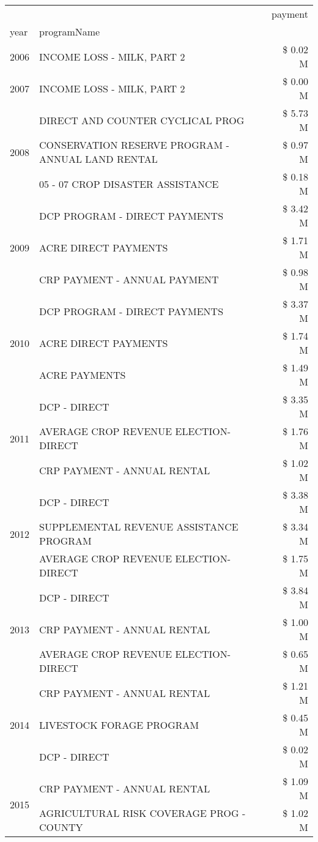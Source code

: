 \begin{tabular}{llr}
\toprule
 &  & payment \\
year & programName &  \\
\midrule
2006 & INCOME LOSS - MILK, PART 2 & \$ 0.02 M \\
\cline{1-3}
2007 & INCOME LOSS - MILK, PART 2 & \$ 0.00 M \\
\cline{1-3}
\multirow[t]{3}{*}{2008} & DIRECT AND COUNTER CYCLICAL PROG & \$ 5.73 M \\
 & CONSERVATION RESERVE PROGRAM - ANNUAL LAND RENTAL & \$ 0.97 M \\
 & 05 - 07 CROP DISASTER ASSISTANCE & \$ 0.18 M \\
\cline{1-3}
\multirow[t]{3}{*}{2009} & DCP PROGRAM - DIRECT PAYMENTS & \$ 3.42 M \\
 & ACRE DIRECT PAYMENTS & \$ 1.71 M \\
 & CRP PAYMENT - ANNUAL PAYMENT & \$ 0.98 M \\
\cline{1-3}
\multirow[t]{3}{*}{2010} & DCP PROGRAM - DIRECT PAYMENTS & \$ 3.37 M \\
 & ACRE DIRECT PAYMENTS & \$ 1.74 M \\
 & ACRE PAYMENTS & \$ 1.49 M \\
\cline{1-3}
\multirow[t]{3}{*}{2011} & DCP - DIRECT & \$ 3.35 M \\
 & AVERAGE CROP REVENUE ELECTION-DIRECT & \$ 1.76 M \\
 & CRP PAYMENT - ANNUAL RENTAL & \$ 1.02 M \\
\cline{1-3}
\multirow[t]{3}{*}{2012} & DCP - DIRECT & \$ 3.38 M \\
 & SUPPLEMENTAL REVENUE ASSISTANCE PROGRAM & \$ 3.34 M \\
 & AVERAGE CROP REVENUE ELECTION-DIRECT & \$ 1.75 M \\
\cline{1-3}
\multirow[t]{3}{*}{2013} & DCP - DIRECT & \$ 3.84 M \\
 & CRP PAYMENT - ANNUAL RENTAL & \$ 1.00 M \\
 & AVERAGE CROP REVENUE ELECTION-DIRECT & \$ 0.65 M \\
\cline{1-3}
\multirow[t]{3}{*}{2014} & CRP PAYMENT - ANNUAL RENTAL & \$ 1.21 M \\
 & LIVESTOCK FORAGE PROGRAM & \$ 0.45 M \\
 & DCP - DIRECT & \$ 0.02 M \\
\cline{1-3}
\multirow[t]{3}{*}{2015} & CRP PAYMENT - ANNUAL RENTAL & \$ 1.09 M \\
 & AGRICULTURAL RISK COVERAGE PROG - COUNTY & \$ 1.02 M \\

\end{tabular}
